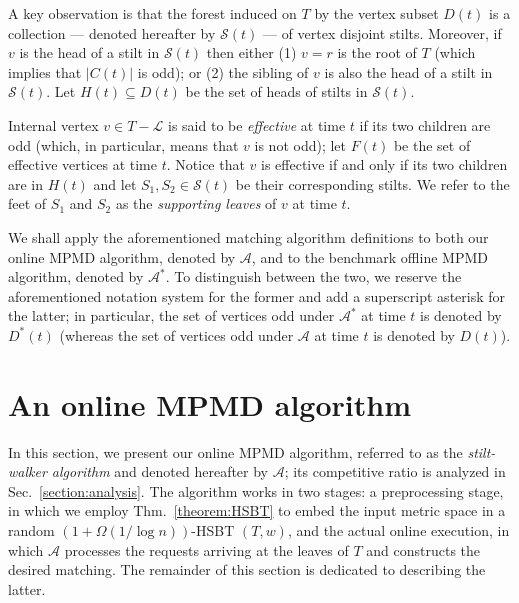 \documentclass[11pt]{article}
\theoremstyle{definition}
\theoremstyle{plain}
\theoremstyle{definition}
\theoremstyle{plain}
\theoremstyle{definition}
\theoremstyle{plain}
\newcommand{\NotationLabel}[1]{\label{notationTable:#1}\ignorespaces}
\newcommand{\Sect}{Sec.}
\newcommand{\Thm}{Thm.}
\newcommand{\Leaves}{\mathcal{L}}
\newcommand{\Active}{\mathit{C}}
\newcommand{\Odd}{\mathit{D}}
\newcommand{\Effective}{\mathit{F}}
\newcommand{\Stilts}{\mathcal{S}}
\newcommand{\Heads}{\mathit{H}}
\newcommand{\A}{\mathcal{A}}
\newcommand{\adv}[1]{{#1}^{*}}
\begin{document}
A key observation is that the forest induced on $T$ by the vertex subset
$\Odd(t)$ is a collection --- denoted hereafter by $\Stilts(t)$ ---
\NotationLabel{alg:stilts}
of vertex disjoint stilts.
Moreover, if $v$ is the head of a stilt in $\Stilts(t)$ then either
(1) $v = r$ is the root of $T$ (which implies that $|\Active(t)|$ is odd); or
(2) the sibling of $v$ is also the head of a stilt in $\Stilts(t)$.
Let
$\Heads(t) \subseteq \Odd(t)$
\NotationLabel{alg:heads}
be the set of heads of stilts in $\Stilts(t)$.

Internal vertex $v \in T - \Leaves$ is said to be \emph{effective} at time $t$
if its two children are odd (which, in particular, means that $v$ is not odd);
let
$\Effective(t)$
\NotationLabel{alg:effective}
be the set of effective vertices at time $t$.
Notice that $v$ is effective if and only if its two children are in
$\Heads(t)$ and let
$S_{1}, S_{2} \in \Stilts(t)$
be their corresponding stilts.
We refer to the feet of $S_{1}$ and $S_{2}$ as the
\emph{supporting leaves} of $v$ at time $t$.

We shall apply the aforementioned matching algorithm definitions to both our
online MPMD algorithm, denoted by $\A$, and to the benchmark offline MPMD
algorithm, denoted by $\adv{\A}$.
To distinguish between the two, we reserve the
aforementioned notation system for the former and add a superscript asterisk
for the latter;
in particular, the set of vertices odd under $\adv{\A}$ at time $t$ is denoted
by
$\adv{\Odd}(t)$
\NotationLabel{alg:adv-odd}
(whereas the set of vertices odd under $\A$ at time $t$ is denoted by
$\Odd(t)$).

\section{An online MPMD algorithm}
\label{section:algorithm}
In this section, we present our online MPMD algorithm, referred to as the
\emph{stilt-walker algorithm} and denoted hereafter by $\A$;
its competitive ratio is analyzed in \Sect{}~\ref{section:analysis}.
The algorithm works in two stages:
a preprocessing stage, in which we employ \Thm{}~\ref{theorem:HSBT} to embed
the input metric space in a random $(1 + \Omega (1 / \log n))$-HSBT $(T, w)$,
and the actual online execution, in which $\A$ processes the requests arriving
at the leaves of $T$ and constructs the desired matching.
The remainder of this section is dedicated to describing the latter.
\end{document}
